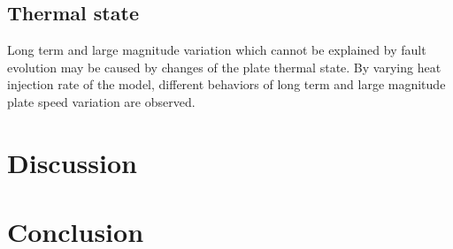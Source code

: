 \documentclass[letterpaper,12pt,notitle]{memphisthesis}                     %
\begin{document}

\section{Thermal state}

Long term and large magnitude variation which cannot be explained by fault evolution may be caused by changes of the plate thermal state. By varying heat injection rate of the model, different behaviors of long term and large magnitude plate speed variation are observed. 


\chapter{Discussion}

\chapter{Conclusion}

\end{document}
